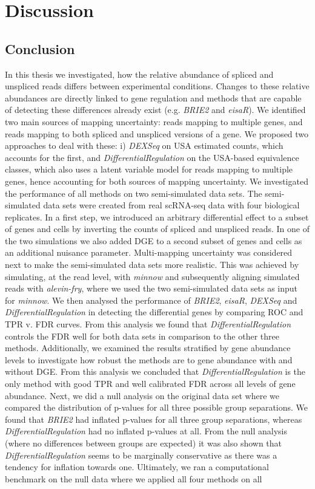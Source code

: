 

\chapter{Discussion}

\section{Conclusion} 
In this thesis we investigated, how the relative abundance of spliced and unspliced reads differs between experimental conditions. Changes to these relative abundances are directly linked to gene regulation and methods that are capable of detecting these differences already exist (e.g. \emph{BRIE2} and \emph{eisaR}). We identified two main sources of mapping uncertainty: reads mapping to multiple genes, and reads mapping to both spliced and unspliced versions of a gene. We proposed two approaches to deal with these: i) \emph{DEXSeq} on USA estimated counts, which accounts for the first, and \emph{DifferentialRegulation} on the USA-based equivalence classes, which also uses a latent variable model for reads mapping to multiple genes, hence accounting for both sources of mapping uncertainty. We investigated the performance of all methods on two semi-simulated data sets. The semi-simulated data sets were created from real scRNA-seq data with four biological replicates. In a first step, we introduced an arbitrary differential effect to a subset of genes and cells by inverting the counts of spliced and unspliced reads. In one of the two simulations we also added DGE to a second subset of genes and cells as an additional nuisance parameter. Multi-mapping uncertainty was considered next to make the semi-simulated data sets more realistic. This was achieved by simulating, at the read level, with \emph{minnow} and subsequently aligning simulated reads with \emph{alevin-fry}, where we used the two semi-simulated data sets as input for \emph{minnow}. We then analysed the performance of \emph{BRIE2}, \emph{eisaR}, \emph{DEXSeq} and \emph{DifferentialRegulation} in detecting the differential genes by comparing ROC and TPR v. FDR curves. From this analysis we found that \emph{DifferentialRegulation} controls the FDR well for both data sets in comparison to the other three methods. Additionally, we examined the results stratified by gene abundance levels to investigate how robust the methods are to gene abundance with and without DGE. From this analysis we concluded that \emph{DifferentialRegulation} is the only method with good TPR and well calibrated FDR across all levels of gene abundance. Next, we did a null analysis on the original data set where we compared the distribution of p-values for all three possible group separations. We found that \emph{BRIE2} had inflated p-values for all three group separations, whereas \emph{DifferentialRegulation} had no inflated p-values at all. From the null analysis (where no differences between groups are expected) it was also shown that \emph{DifferentialRegulation} seems to be marginally conservative as there was a tendency for inflation towards one. Ultimately, we ran a computational benchmark on the null data where we applied all four methods on all 